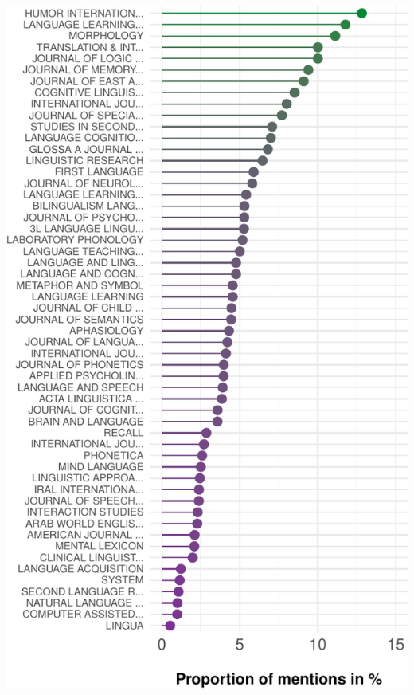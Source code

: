 \documentclass[]{elsarticle} %
\begin{document}
\begin{center}\includegraphics[width=1\linewidth]{ReplicationLing_files/figure-latex/topten_plot-1} \end{center}
\end{document}
